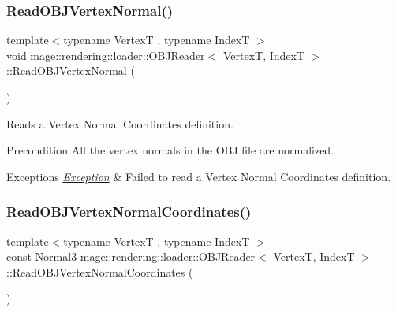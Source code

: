 \subsubsection{\texorpdfstring{Read\+O\+B\+J\+Vertex\+Normal()}{ReadOBJVertexNormal()}}
{\footnotesize\ttfamily template$<$typename VertexT , typename IndexT $>$ \\
void \hyperlink{classmage_1_1rendering_1_1loader_1_1_o_b_j_reader}{mage\+::rendering\+::loader\+::\+O\+B\+J\+Reader}$<$ VertexT, IndexT $>$\+::Read\+O\+B\+J\+Vertex\+Normal (\begin{DoxyParamCaption}{ }\end{DoxyParamCaption})\hspace{0.3cm}{\ttfamily [private]}}

Reads a Vertex Normal Coordinates definition.

\begin{DoxyPrecond}{Precondition}
All the vertex normals in the O\+BJ file are normalized. 
\end{DoxyPrecond}

\begin{DoxyExceptions}{Exceptions}
{\em \hyperlink{classmage_1_1_exception}{Exception}} & Failed to read a Vertex Normal Coordinates definition. \\
\hline
\end{DoxyExceptions}
\hypertarget{classmage_1_1rendering_1_1loader_1_1_o_b_j_reader_aa91768722fd418aeba3f12915e8e1525}{}\label{classmage_1_1rendering_1_1loader_1_1_o_b_j_reader_aa91768722fd418aeba3f12915e8e1525} 
\subsubsection{\texorpdfstring{Read\+O\+B\+J\+Vertex\+Normal\+Coordinates()}{ReadOBJVertexNormalCoordinates()}}
{\footnotesize\ttfamily template$<$typename VertexT , typename IndexT $>$ \\
const \hyperlink{structmage_1_1_normal3}{Normal3} \hyperlink{classmage_1_1rendering_1_1loader_1_1_o_b_j_reader}{mage\+::rendering\+::loader\+::\+O\+B\+J\+Reader}$<$ VertexT, IndexT $>$\+::Read\+O\+B\+J\+Vertex\+Normal\+Coordinates (\begin{DoxyParamCaption}{ }\end{DoxyParamCaption})\hspace{0.3cm}{\ttfamily [private]}}

